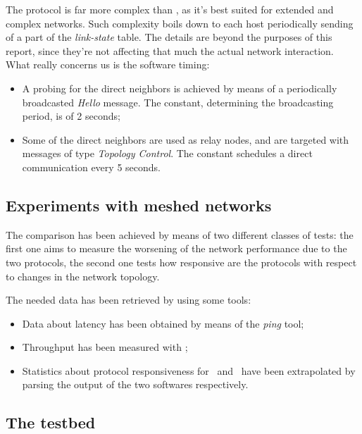     The protocol is far more complex than \batman, as it's best suited for
    extended and complex networks. Such complexity boils down to
    each host periodically sending of a part of the \emph{link-state}
    table. The details are beyond the purposes of this report, since
    they're not affecting that much the actual network interaction. What
    really concerns us is the software timing:
    \begin{itemize}
    \item   A probing for the direct neighbors is achieved by means of a
            periodically broadcasted \emph{Hello} message. The
             constant, determining the broadcasting
            period, is of 2 seconds;
    \item   Some of the direct neighbors are used as relay nodes, and are
            targeted with messages of type \emph{Topology Control}.
            The  constant schedules a direct
            communication every 5 seconds.
    \end{itemize}

\subsection{Experiments with meshed networks}

    The comparison has been achieved by means of two different classes
    of tests: the first one aims to measure the worsening of the network
    performance due to the two protocols, the second one tests how
    responsive are the protocols with respect to changes in the
    network topology.

    The needed data has been retrieved by using some tools:
    \begin{itemize}
    \item   Data about latency has been obtained by means of the
            \emph{ping} tool;
    \item   Throughput has been measured with
            \netperf\cite{bib:NetPerf};
    \item   Statistics about protocol responsiveness for \batman\ and
            \olsr\ have been extrapolated by parsing the output of the
            two softwares respectively.
    \end{itemize}

\subsection{The testbed}

